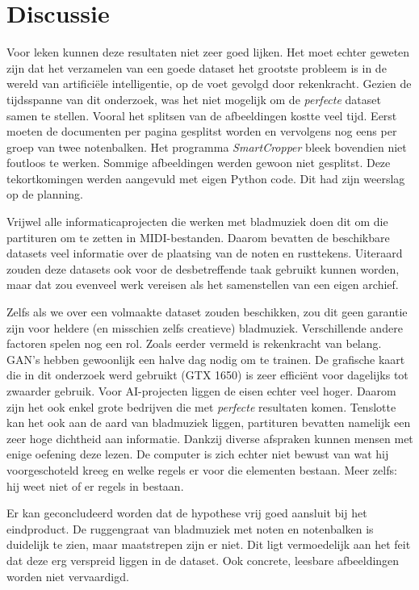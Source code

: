 \documentclass[dutch, twoside, a4paper, 10pt]{article}
\begin{document}
\section{Discussie}
\noindent Voor leken kunnen deze resultaten niet zeer goed lijken. Het moet echter geweten zijn dat het verzamelen van een goede dataset het grootste probleem is in de wereld van artificiële intelligentie, op de voet gevolgd door rekenkracht. Gezien de tijdsspanne van dit onderzoek, was het niet mogelijk om de \textit{perfecte} dataset samen te stellen. Vooral het splitsen van de afbeeldingen kostte veel tijd. Eerst moeten de documenten per pagina gesplitst worden en vervolgens nog eens per groep van twee notenbalken. Het programma \textit{SmartCropper} bleek bovendien niet foutloos te werken. Sommige afbeeldingen werden gewoon niet gesplitst. Deze tekortkomingen werden aangevuld met eigen Python code. Dit had zijn weerslag op de planning.
\par\bigskip\noindent
Vrijwel alle informaticaprojecten die werken met bladmuziek doen dit om die partituren om te zetten in MIDI-bestanden. Daarom bevatten de beschikbare datasets veel informatie over de plaatsing van de noten en rusttekens. Uiteraard zouden deze datasets ook voor de desbetreffende taak gebruikt kunnen worden, maar dat zou evenveel werk vereisen als het samenstellen van een eigen archief.
\par\bigskip\noindent
Zelfs als we over een volmaakte dataset zouden beschikken, zou dit geen garantie zijn voor heldere (en misschien zelfs creatieve) bladmuziek. Verschillende andere factoren spelen nog een rol. Zoals eerder vermeld is rekenkracht van belang. GAN's hebben gewoonlijk een halve dag nodig om te trainen. De grafische kaart die in dit onderzoek werd gebruikt (GTX 1650) is zeer efficiënt voor dagelijks tot zwaarder gebruik. Voor AI-projecten liggen de eisen echter veel hoger. Daarom zijn het ook enkel grote bedrijven die met \textit{perfecte} resultaten komen. Tenslotte kan het ook aan de aard van bladmuziek liggen, partituren bevatten namelijk een zeer hoge dichtheid aan informatie. Dankzij diverse afspraken kunnen mensen met enige oefening deze lezen. De computer is zich echter niet bewust van wat hij voorgeschoteld kreeg en welke regels er voor die elementen bestaan. Meer zelfs: hij weet niet of er regels in bestaan.
\par\bigskip\noindent
Er kan geconcludeerd worden dat de hypothese vrij goed aansluit bij het eindproduct. De ruggengraat van bladmuziek met noten en notenbalken is duidelijk te zien, maar maatstrepen zijn er niet. Dit ligt vermoedelijk aan het feit dat deze erg verspreid liggen in de dataset. Ook concrete, leesbare afbeeldingen worden niet vervaardigd. 
\end{document}
